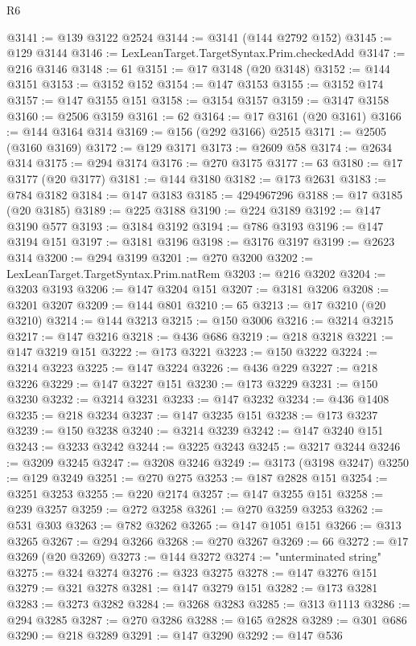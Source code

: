 \begin{lexlean}{R6}
\begin{coremodule}
@3141 := @139 @3122 @2524
@3144 := @3141 (@144 @2792 @152)
@3145 := @129 @3144
@3146 := LexLeanTarget.TargetSyntax.Prim.checkedAdd
@3147 := @216 @3146
@3148 := 61
@3151 := @17 @3148 (@20 @3148)
@3152 := @144 @3151
@3153 := @3152 @152
@3154 := @147 @3153
@3155 := @3152 @174
@3157 := @147 @3155 @151
@3158 := @3154 @3157
@3159 := @3147 @3158
@3160 := @2506 @3159
@3161 := 62
@3164 := @17 @3161 (@20 @3161)
@3166 := @144 @3164 @314
@3169 := @156 (@292 @3166) @2515
@3171 := @2505 (@3160 @3169)
@3172 := @129 @3171
@3173 := @2609 @58
@3174 := @2634 @314
@3175 := @294 @3174
@3176 := @270 @3175
@3177 := 63
@3180 := @17 @3177 (@20 @3177)
@3181 := @144 @3180
@3182 := @173 @2631
@3183 := @784 @3182
@3184 := @147 @3183
@3185 := 4294967296
@3188 := @17 @3185 (@20 @3185)
@3189 := @225 @3188
@3190 := @224 @3189
@3192 := @147 @3190 @577
@3193 := @3184 @3192
@3194 := @786 @3193
@3196 := @147 @3194 @151
@3197 := @3181 @3196
@3198 := @3176 @3197
@3199 := @2623 @314
@3200 := @294 @3199
@3201 := @270 @3200
@3202 := LexLeanTarget.TargetSyntax.Prim.natRem
@3203 := @216 @3202
@3204 := @3203 @3193
@3206 := @147 @3204 @151
@3207 := @3181 @3206
@3208 := @3201 @3207
@3209 := @144 @801
@3210 := 65
@3213 := @17 @3210 (@20 @3210)
@3214 := @144 @3213
@3215 := @150 @3006
@3216 := @3214 @3215
@3217 := @147 @3216
@3218 := @436 @686
@3219 := @218 @3218
@3221 := @147 @3219 @151
@3222 := @173 @3221
@3223 := @150 @3222
@3224 := @3214 @3223
@3225 := @147 @3224
@3226 := @436 @229
@3227 := @218 @3226
@3229 := @147 @3227 @151
@3230 := @173 @3229
@3231 := @150 @3230
@3232 := @3214 @3231
@3233 := @147 @3232
@3234 := @436 @1408
@3235 := @218 @3234
@3237 := @147 @3235 @151
@3238 := @173 @3237
@3239 := @150 @3238
@3240 := @3214 @3239
@3242 := @147 @3240 @151
@3243 := @3233 @3242
@3244 := @3225 @3243
@3245 := @3217 @3244
@3246 := @3209 @3245
@3247 := @3208 @3246
@3249 := @3173 (@3198 @3247)
@3250 := @129 @3249
@3251 := @270 @275
@3253 := @187 @2828 @151
@3254 := @3251 @3253
@3255 := @220 @2174
@3257 := @147 @3255 @151
@3258 := @239 @3257
@3259 := @272 @3258
@3261 := @270 @3259 @3253
@3262 := @531 @303
@3263 := @782 @3262
@3265 := @147 @1051 @151
@3266 := @313 @3265
@3267 := @294 @3266
@3268 := @270 @3267
@3269 := 66
@3272 := @17 @3269 (@20 @3269)
@3273 := @144 @3272
@3274 := "unterminated string"
@3275 := @324 @3274
@3276 := @323 @3275
@3278 := @147 @3276 @151
@3279 := @321 @3278
@3281 := @147 @3279 @151
@3282 := @173 @3281
@3283 := @3273 @3282
@3284 := @3268 @3283
@3285 := @313 @1113
@3286 := @294 @3285
@3287 := @270 @3286
@3288 := @165 @2828
@3289 := @301 @686
@3290 := @218 @3289
@3291 := @147 @3290
@3292 := @147 @536

\end{coremodule}
\end{lexlean}
